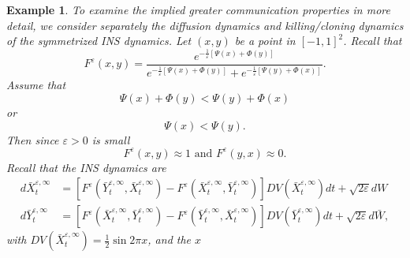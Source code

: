 \documentclass[english,11pt]{article}%
\newtheorem{example}{Example}
\numberwithin{equation}{section}
\numberwithin{example}{section}
\numberwithin{theorem}{section}
\begin{document}
\begin{example}
To examine the implied greater communication properties in more detail, we consider separately the diffusion dynamics and killing/cloning dynamics
%
of the 
symmetrized INS dynamics.
Let $(x,y)$ be a point in
$[-1,1]^{2}$. Recall that
\[
F^{\varepsilon}(x,y)=\frac{e^{-\frac{1}{\varepsilon}\left[  \Psi
(x)+\Phi(y)\right]  }}{e^{-\frac{1}{\varepsilon}\left[  \Psi(x)+\Phi
(y)\right]  }+e^{-\frac{1}{\varepsilon}\left[  \Psi(y)+\Phi(x)\right]  }}.
\]
Assume that
\[
\Psi(x)+\Phi(y)<\Psi(y)+\Phi(x)
\]
or
\[
\Psi(x)<\Psi(y).
\]
Then since $\varepsilon>0$ is small
\[
F^{\varepsilon}(x,y)\approx1\text{ and }F^{\varepsilon}(y,x)\approx0.
\]
Recall that the INS dynamics are
\begin{align*}
d\bar{X}_{t}^{\varepsilon,\infty}  &  =\left[  F^{\varepsilon}(\bar{Y}%
_{t}^{\varepsilon,\infty},\bar{X}_{t}^{\varepsilon,\infty})-F^{\varepsilon
}(\bar{X}_{t}^{\varepsilon,\infty},\bar{Y}_{t}^{\varepsilon,\infty})\right]
DV(\bar{X}_{t}^{\varepsilon,\infty})dt+\sqrt{2\varepsilon}dW\\
d\bar{Y}_{t}^{\varepsilon,\infty}  &  =\left[  F^{\varepsilon}(\bar{X}%
_{t}^{\varepsilon,\infty},\bar{Y}_{t}^{\varepsilon,\infty})-F^{\varepsilon
}(\bar{Y}_{t}^{\varepsilon,\infty},\bar{X}_{t}^{\varepsilon,\infty})\right]
DV(\bar{Y}_{t}^{\varepsilon,\infty})dt+\sqrt{2\varepsilon}d\bar{W},
\end{align*}
with $DV(\bar{X}_{t}^{\varepsilon,\infty})=\frac{1}{2}\sin2\pi x$, and the $x$

\end{example}
\end{document}
